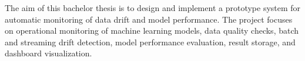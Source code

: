 \documentclass[11pt,a4paper,oneside]{book}
\begin{document}
The aim of this bachelor thesis is to design and implement a prototype system for automatic monitoring of data drift and model performance. The project focuses on operational monitoring of machine learning models, data quality checks, batch and streaming drift detection, model performance evaluation, result storage, and dashboard visualization.

\clearpage









\backmatter
\pagestyle{plain}

\nocite{*}

\printbibliography[heading=bibintoc,title={Bibliography}]
\end{document}
